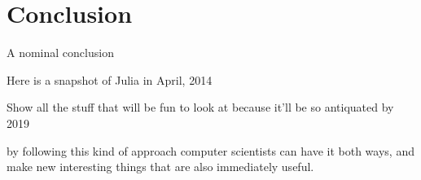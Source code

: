 \chapter{Conclusion}

A nominal conclusion

Here is a snapshot of Julia in April, 2014

Show all the stuff that will be fun to look at because it\textquoteright{}ll
be so antiquated by 2019


by following this kind of approach computer scientists can have it
both ways, and make new interesting things that are also immediately
useful.
